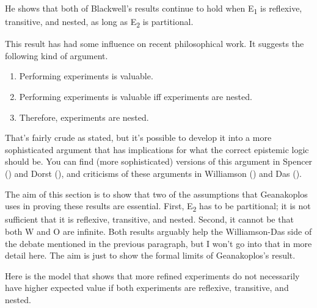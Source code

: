 \documentclass[
  12pt,
  letterpaper,
  DIV=11,
  numbers=noendperiod]{scrartcl}
\providecommand{\tightlist}{%
  \setlength{\itemsep}{0pt}\setlength{\parskip}{0pt}}\usepackage{longtable,booktabs,array}
\begin{document}
He shows that both of Blackwell's results continue to hold when
E\textsubscript{1} is reflexive, transitive, and nested, as long as
E\textsubscript{2} is partitional.

This result has had some influence on recent philosophical work. It
suggests the following kind of argument.

\begin{enumerate}
\def\labelenumi{\arabic{enumi}.}
\tightlist
\item
  Performing experiments is valuable.
\item
  Performing experiments is valuable iff experiments are nested.
\item
  Therefore, experiments are nested.
\end{enumerate}

That's fairly crude as stated, but it's possible to develop it into a
more sophisticated argument that has implications for what the correct
epistemic logic should be. You can find (more sophisticated) versions of
this argument in Spencer () and Dorst
(), and criticisms of these arguments in
Williamson () and Das
().

The aim of this section is to show that two of the assumptions that
Geanakoplos uses in proving these results are essential. First,
E\textsubscript{2} has to be partitional; it is not sufficient that it
is reflexive, transitive, and nested. Second, it cannot be that both W
and O are infinite. Both results arguably help the Williamson-Das side
of the debate mentioned in the previous paragraph, but I won't go into
that in more detail here. The aim is just to show the formal limits of
Geanakoplos's result.

Here is the model that shows that more refined experiments do not
necessarily have higher expected value if both experiments are
reflexive, transitive, and nested.
\end{document}
